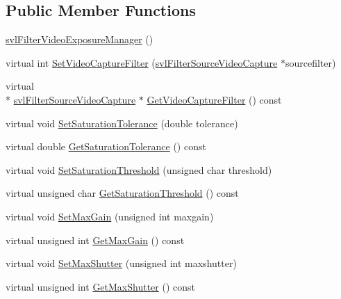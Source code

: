 \subsection*{Public Member Functions}
\begin{DoxyCompactItemize}
\item 
\hyperlink{classsvl_filter_video_exposure_manager_aee6501625b5da7e0d1ccf214df9e8718}{svl\-Filter\-Video\-Exposure\-Manager} ()
\item 
virtual int \hyperlink{classsvl_filter_video_exposure_manager_ac4752946ce8c27aa0ef73e4cdaaec5c9}{Set\-Video\-Capture\-Filter} (\hyperlink{classsvl_filter_source_video_capture}{svl\-Filter\-Source\-Video\-Capture} $\ast$sourcefilter)
\item 
virtual \\*
\hyperlink{classsvl_filter_source_video_capture}{svl\-Filter\-Source\-Video\-Capture} $\ast$ \hyperlink{classsvl_filter_video_exposure_manager_a4192edd57895da5cb3081c472f044b48}{Get\-Video\-Capture\-Filter} () const 
\item 
virtual void \hyperlink{classsvl_filter_video_exposure_manager_a6bfb1a6bab6882ddd448a1ee5b5406e0}{Set\-Saturation\-Tolerance} (double tolerance)
\item 
virtual double \hyperlink{classsvl_filter_video_exposure_manager_ae984963200bcf2fbdb1b40d42df4335a}{Get\-Saturation\-Tolerance} () const 
\item 
virtual void \hyperlink{classsvl_filter_video_exposure_manager_a3750e525f8fd7675dccf30a126342cc7}{Set\-Saturation\-Threshold} (unsigned char threshold)
\item 
virtual unsigned char \hyperlink{classsvl_filter_video_exposure_manager_a1ba163365e52a1dd21929ae7574a51b4}{Get\-Saturation\-Threshold} () const 
\item 
virtual void \hyperlink{classsvl_filter_video_exposure_manager_a56e877b051b622038a19b6b99af5946f}{Set\-Max\-Gain} (unsigned int maxgain)
\item 
virtual unsigned int \hyperlink{classsvl_filter_video_exposure_manager_aeb9862e63a3baaaaa7ce54ee8102775d}{Get\-Max\-Gain} () const 
\item 
virtual void \hyperlink{classsvl_filter_video_exposure_manager_ae7a5bbc3333df726f48510459445f524}{Set\-Max\-Shutter} (unsigned int maxshutter)
\item 
virtual unsigned int \hyperlink{classsvl_filter_video_exposure_manager_a36b3cbe18e865d2ad232d9a6a5114c43}{Get\-Max\-Shutter} () const 
\end{DoxyCompactItemize}
